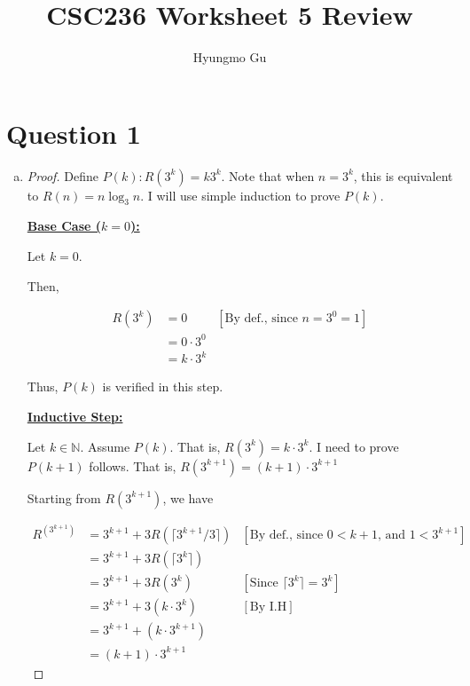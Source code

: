 \documentclass[12pt]{article}
\begin{document}
\title{CSC236 Worksheet 5 Review}
\author{Hyungmo Gu}
\maketitle

\section*{Question 1}
\begin{enumerate}[a.]
    \item

    \begin{proof}
        Define $P(k): R(3^k) = k3^k$. Note that when $n = 3^k$, this is equivalent
        to $R(n) = n\log_3 n$. I will use simple induction to prove $P(k)$.

        \bigskip

        \underline{\textbf{Base Case ($k = 0$):}}

        \bigskip

        Let $k = 0$.

        \bigskip

        Then,

        \begin{align}
            R(3^k) &= 0 & [\text{By def., since $n = 3^0 = 1$}]\\
            &= 0 \cdot 3^0\\
            &= k \cdot 3^k
        \end{align}

        \bigskip

        Thus, $P(k)$ is verified in this step.

        \bigskip

        \underline{\textbf{Inductive Step:}}

        \bigskip

        Let $k \in \mathbb{N}$. Assume $P(k)$. That is, $R(3^k) = k \cdot 3^k$.
        I need to prove $P(k+1)$ follows. That is, $R(3^{k+1}) = (k+1) \cdot 3^{k+1}$

        \bigskip

        Starting from $R(3^{k+1})$, we have

        \begin{align}
            R^(3^{k+1}) &= 3^{k+1} + 3R(\lceil 3^{k+1}/3 \rceil) & [\text{By def., since $0<k+1$, and $1<3^{k+1}$}]\\
            &= 3^{k+1} + 3R(\lceil 3^k \rceil)\\
            &= 3^{k+1} + 3R(3^k) & [\text{Since $\lceil 3^k \rceil = 3^k$}]\\
            &= 3^{k+1} + 3 (k \cdot 3^k) & [\text{By I.H}]\\
            &= 3^{k+1} + (k \cdot 3^{k+1})\\
            &= (k + 1) \cdot 3^{k+1}
        \end{align}
    \end{proof}


\end{enumerate}
\end{document}

